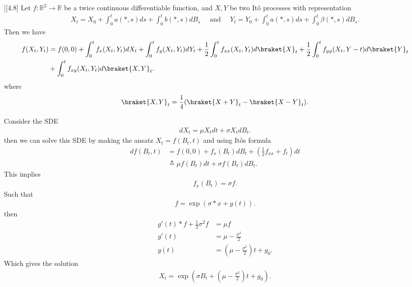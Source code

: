 \begin{Theorem}][4.8]
  Let $f : \mathbb{R}^{2} \to  \mathbb{R} $ be a twice continuous differentiable function, and $X,Y$ be two It\^o processes with representation 
  \begin{align*}
    X_t = X_{0} + \int_0^{t} a(*,s) ds + \int_0^{t} b(*,s)dB_s \quad \text{ and } \quad Y_t = Y_{0} + \int_0^{t} a(*,s) ds + \int_0^{t} \beta(*,s) dB_s
  .\end{align*}
  Then we have 
  \begin{align*}
    f(X_t,Y_t) &= f(0,0) + \int_0^{t} f_x(X_t,Y_t) dX_t + \int_0^{t} f_y(X_t,Y_t) dY_t + \frac{1}{2}\int_0^{t} f_{x x}(X_t,Y_t) d\braket{X}_t + \frac{1}{2}\int_0^{t} f_{y y}(X_t,Y-t) d\braket{Y}_t \\
               &+ \int_0^{t} f_{xy}(X_t,Y_t) d\braket{X,Y}_t 
  .\end{align*}
  where 
  \begin{align*}
    \braket{X,Y}_t = \frac{1}{4}(\braket{X+Y}_t - \braket{X-Y}_t)
  .\end{align*}
\end{Theorem}
\begin{example}[5.1]
 Consider the SDE 
 \begin{align*}
  dX_t = \mu X_t dt + \sigma X_t dB_t
 .\end{align*}
 then we can solve this SDE by making the ansatz $X_t = f(B_t,t)$ and using It\^os formula
 \begin{align*}
   df(B_t,t) &= f(0,0) + f_x(B_t)dB_t + (\frac{1}{2}f_{x x}+f_{t}) dt\\
           &\triangleq  \mu  f(B_t) dt + \sigma f(B_t)dB_t
 .\end{align*}
 This implies 
 \begin{align*}
  f_x(B_t) = \sigma  f
 .\end{align*}
 Such that 
 \begin{align*}
  f = \exp(\sigma*x + g(t))
 .\end{align*}
 then 
 \begin{align*}
   g'(t)*f + \frac{1}{2} \sigma^2 f &= \mu  f\\
                                g'(t)   &= \mu  - \frac{\sigma^2}{2}\\
                                g(t)&= (\mu  - \frac{\sigma^2}{2})t + g_{0}
 .\end{align*}
 Which gives the solution 
 \begin{align*}
  X_t = \exp(\sigma B_t + (\mu -\frac{\sigma^2}{2})t + g_{0})
 .\end{align*}
\end{example}
